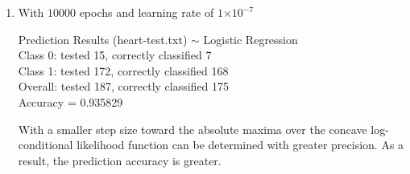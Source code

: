 \documentclass[12pt]{article}
\newcommand{\e}[1]{\ensuremath{\times 10^{#1}}}
\begin{document}
\begin{enumerate}
               \item
                  With $10000$ epochs and learning rate of $1\e{-7}$

                  Prediction Results (heart-test.txt) $\sim$ Logistic Regression\\
                  Class 0: tested 15, correctly classified 7\\
                  Class 1: tested 172, correctly classified 168\\
                  Overall: tested 187, correctly classified 175\\
                  Accuracy = 0.935829

                  With a smaller step size toward the absolute maxima over the concave
                  log-conditional likelihood function can be determined with greater
                  precision. As a result, the prediction accuracy is greater.
            \end{enumerate}
\end{document}
